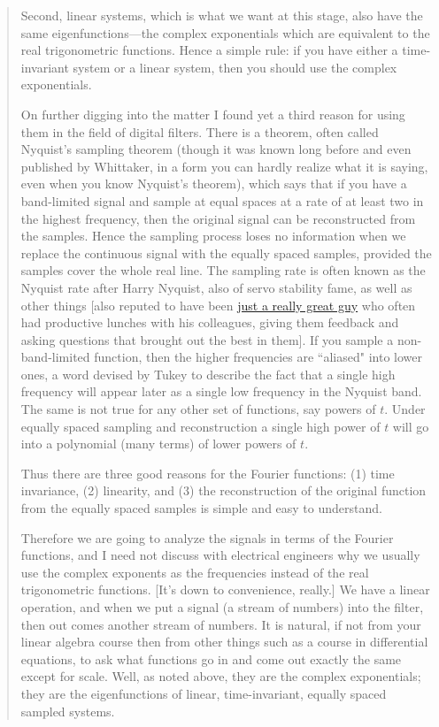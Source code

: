 \documentclass[10pt]{article}
\begin{document}
{\begin{quotation}
Second, linear systems, which is what we want at this stage, also have the same eigenfunctions—the complex exponentials which are equivalent to the real trigonometric functions. Hence a simple rule: if you have either a time-invariant system or a linear system, then you should use the complex exponentials.

On further digging into the matter I found yet a third reason for using them in the field of digital filters. There is a theorem, often called Nyquist's sampling theorem (though it was known long before and even published by Whittaker, in a form you can hardly realize what it is saying, even when you know Nyquist's theorem), which says that if you have a band-limited signal and sample at equal spaces at a rate of at least two in the highest frequency, then the original signal can be reconstructed from the samples. Hence the sampling process loses no information when we replace the continuous signal with the equally spaced samples, provided the samples cover the whole real line. The sampling rate is often known as the Nyquist rate after Harry Nyquist, also of servo stability fame, as well as other things [also reputed to have been \href{https://deanebarker.net/tech/linkedin/harry-nyquist-again/}{just a really great guy} who often had productive lunches with his colleagues, giving them feedback and asking questions that brought out the best in them]. If you sample a non-band-limited function, then the higher frequencies are ``aliased" into lower ones, a word devised by Tukey to describe the fact that a single high frequency will appear later as a single low frequency in the Nyquist band. The same is not true for any other set of functions, say powers of $t$. Under equally spaced sampling and reconstruction a single high power of $t$ will go into a polynomial (many terms) of lower powers of $t$.

Thus there are three good reasons for the Fourier functions: (1) time invariance, (2) linearity, and (3) the reconstruction of the original function from the equally spaced samples is simple and easy to understand.

Therefore we are going to analyze the signals in terms of the Fourier functions, and I need not discuss with electrical engineers why we usually use the complex exponents as the frequencies instead of the real trigonometric functions. [It's down to convenience, really.] We have a linear operation, and when we put a signal (a stream of numbers) into the filter, then out comes another stream of numbers. It is natural, if not from your linear algebra course then from other things such as a course in differential equations, to ask what functions go in and come out exactly the same except for scale. Well, as noted above, they are the complex exponentials; they are the eigenfunctions of linear, time-invariant, equally spaced sampled systems.


\end{quotation}}
\end{document}
